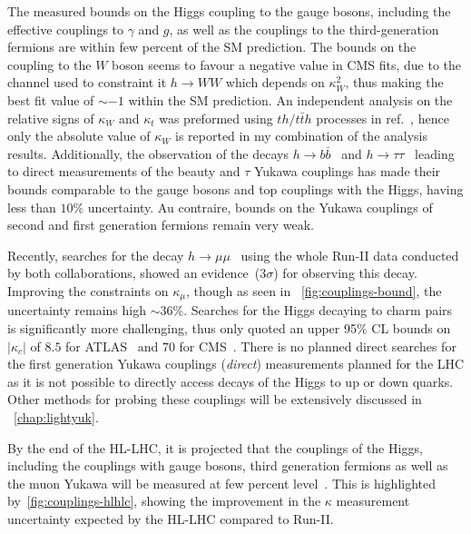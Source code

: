 \par The measured bounds on the Higgs coupling to the gauge bosons, including the effective couplings to $\gamma$ and $g$, as well as the couplings to the third-generation fermions are within few percent of the SM prediction. The bounds on the coupling to the $W$ boson seems to favour a negative value in CMS fits, due to the channel used to constraint it $ h \to WW$ which depends on $ \kappa_W^2$, thus making the best fit value of $ \sim -1$ within the SM prediction. An independent analysis on the relative signs of $\kappa_W$ and $\kappa_t$ was preformed using $th/t \bar{t} h$ processes in ref.~\cite{CMS:2018jeh}, hence only the absolute value of $\kappa_W$ is reported in my combination of the analysis results.  Additionally,  the observation of the decays $ h \to b \bar{b}$~\cite{CMS:2018nsn,ATLAS:2018kot,ATLAS:2019yhn} and $h \to \tau \tau$~\cite{ATLAS:2018ynr,CMS:2019pyn} leading to direct measurements of the beauty and $\tau$ Yukawa couplings has  made their bounds comparable to the gauge bosons and top couplings with the Higgs, having less than $10\%$ uncertainty.  Au contraire, bounds on the Yukawa couplings of second and first generation fermions remain very weak.  
\par Recently, searches for the decay  $ h\to \mu \mu$~\cite{ATLAS:2020fzp,CMS:2020xwi} using the whole Run-II data conducted by both collaborations, showed an evidence~($ 3 \sigma$) for observing this decay. Improving the constraints on $\kappa_\mu$, though as seen in ~\autoref{fig:couplings-bound}, the uncertainty remains high $ \sim 36 \%$.  Searches for the Higgs decaying to charm pairs is significantly more challenging, thus only quoted an upper 95\% CL  bounds on $ |\kappa_c|$ of $8.5$ for ATLAS~\cite{ATLAS-CONF-2021-021,ATLAS:2022ers} and $70$ for CMS~\cite{CMS:2019hve}. There is no planned direct searches for the first generation Yukawa couplings (\emph{direct}) measurements planned for the LHC as it is not possible to directly access decays of the Higgs to up or down quarks. Other methods for probing these couplings will be extensively discussed in  ~\autoref{chap:lightyuk}.
\par By the end of the HL-LHC, it is projected that the couplings of the Higgs, including the couplings with gauge bosons, third generation fermions as well as the muon Yukawa will be measured at few percent level~\cite{Bernius:2666331}. This is highlighted by~\autoref{fig:couplings-hlhlc},  showing the improvement in the $\kappa$ measurement uncertainty expected by the HL-LHC compared to Run-II.
